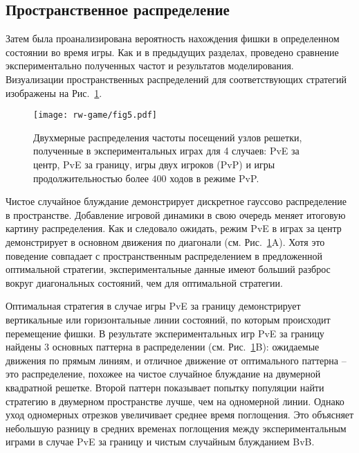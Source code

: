 \subsection{Пространственное распределение}\label{subsec:ch3/sec4/sub4}

Затем была проанализирована вероятность нахождения фишки в определенном состоянии во время игры. Как и в предыдущих разделах, проведено сравнение экспериментально полученных частот и результатов моделирования. Визуализации пространственных распределений для соответствующих стратегий изображены на Рис.~\cref{fig:distribution_states}.

\begin{figure}[t]
    \centering
    \texttt{[image: rw-game/fig5.pdf]}
    \caption{
        Двухмерные распределения частоты посещений узлов решетки, полученные в экспериментальных играх для 4 случаев: 
        PvE за центр, PvE за границу, игры двух игроков (PvP) и игры продолжительностью более $400$ ходов в режиме PvP.
    }  
    \label{fig:distribution_states}
    
\end{figure}

Чистое случайное блуждание демонстрирует дискретное гауссово распределение в пространстве. Добавление игровой динамики в свою очередь меняет итоговую картину распределения. Как и следовало ожидать, режим PvE в играх за центр демонстрирует в основном движения по диагонали (см. Рис.~\cref{fig:distribution_states}A). Хотя это поведение совпадает с пространственным распределением в предложенной оптимальной стратегии, экспериментальные данные имеют больший разброс вокруг диагональных состояний, чем для оптимальной стратегии.

Оптимальная стратегия в случае игры PvE за границу демонстрирует вертикальные или горизонтальные линии состояний, по которым происходит перемещение фишки. В результате экспериментальных игр PvE за границу найдены 3 основных паттерна в распределении (см. Рис.~\cref{fig:distribution_states}B): ожидаемые движения по прямым линиям, и отличное движение от оптимального паттерна -- это распределение, похожее на чистое случайное блуждание на двумерной квадратной решетке. Второй паттерн показывает попытку популяции найти стратегию в двумерном пространстве лучше, чем на одномерной линии. Однако уход одномерных отрезков увеличивает среднее время поглощения. Это объясняет небольшую разницу в средних временах поглощения между экспериментальным играми в случае PvE за границу и чистым случайным блужданием BvB.

